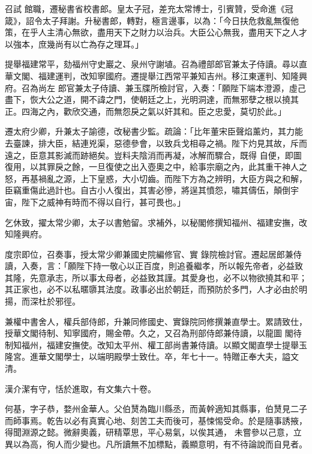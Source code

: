 \begin{pinyinscope}
 召試
 館職，遷秘書省校書郎。皇太子冠，差充太常博士，引賓贊，受命進《冠箴》，詔令太子拜謝。升秘書郎，轉對，極言邊事，以為：「今日扶危救亂無復他策，在乎人主清心無欲，盡用天下之財力以治兵。大臣公心無我，盡用天下之人才以強本，庶幾尚有以亡為存之理耳。」



 提舉福建常平，劾福州守史巖之、泉州守謝埴。召為禮部郎官兼太子侍讀。尋以直華文閣、福建運判，改知寧國府。遷提舉江西常平兼知吉州。移江東運判、知隆興府。召為尚左
 郎官兼太子侍讀、兼玉牒所檢討官，入奏：「願陛下端本澄源，虛己盡下，恢大公之道，開不諱之門，使朝廷之上，光明洞達，而無邪孽之根以撓其正。四海之內，歡欣交通，而無怨戾之氣以奸其和。臣之忠愛，莫切於此。」



 遷太府少卿，升兼太子諭德，改秘書少監。疏論：「比年董宋臣聲焰薰灼，其力能去臺諫，排大臣，結連兇渠，惡德參會，以致兵戈相尋之禍。陛下灼見其故，斥而遠之，臣意其影滅而跡絕矣。豈料夫陰消而再凝，冰解而驟合，既得
 自便，即圖復用，以其罪戾之餘，一旦復使之出入壺奧之中，給事宗廟之內，此其重干神人之怒，再基禍亂之源，上下皇惑，大小切齒。而陛下方為之辨明，大臣方與之和解，臣竊重傷此過計也。自古小人復出，其害必慘，將逞其憤怨，嘯其儔伍，顛倒宇宙，陛下之威神有時而不得以自行，甚可畏也。」



 乞休致，擢太常少卿，太子以書勉留。求補外，以秘閣修撰知福州、福建安撫，改知隆興府。



 度宗即位，召奏事，授太常少卿兼國史院編修官、實
 錄院檢討官。遷起居郎兼侍讀，入奏，言：「願陛下持一敬心以正百度，則追養繼孝，所以報先帝者，必益致其隆，先意承志，所以事太母者，必益致其謹。其愛身也，必不以物欲撓其和平；其正家也，必不以私暱隳其法度。政事必出於朝廷，而預防於多門，人才必由於明揚，而深杜於邪徑。



 兼權中書舍人，權兵部侍郎，升兼同修國史、實錄院同修撰兼直學士。累請致仕，授華文閣待制、知寧國府，賜金帶。久之，又召為刑部侍郎兼侍讀，以龍圖
 閣待制知福州，福建安撫使。改知太平州、權工部尚書兼侍讀。以顯文閣直學士提舉玉隆宮。進華文閣學士，以端明殿學士致仕。卒，年七十一。特贈正奉大夫，謚文清。



 漢介潔有守，恬於進取，有文集六十卷。



 何基，字子恭，婺州金華人。父伯熭為臨川縣丞，而黃幹適知其縣事，伯熭見二子而師事焉。乾告以必有真實心地、刻苦工夫而後可，基悚惕受命。於是隨事誘掖，得聞淵源之懿。微辭奧義，研精覃思，平心易氣，以俟其通，
 未嘗參以己意，立異以為高，徇人而少變也。凡所讀無不加標點，義顯意明，有不待論說而自見者。




\end{pinyinscope}
